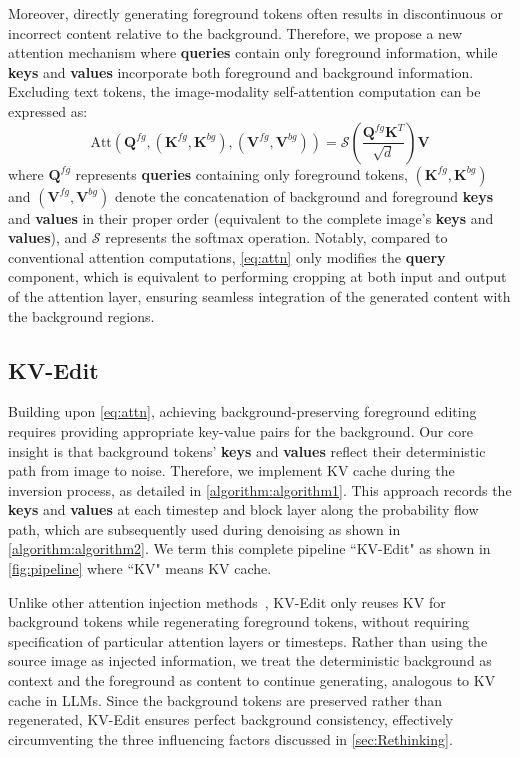 Moreover, directly generating foreground tokens often results in discontinuous or incorrect content relative to the background. Therefore, we propose a new attention mechanism where \textbf{queries} contain only foreground information, while \textbf{keys} and \textbf{values} incorporate both foreground and background information. Excluding text tokens, the image-modality self-attention computation can be expressed as:
\begin{equation}
\mathrm{Att}(\mathbf{Q}^{fg},(\mathbf{K}^{fg},\mathbf{K}^{bg}),(\mathbf{V}^{fg},\mathbf{V}^{bg}))=\mathcal{S}(\frac{\mathbf{Q}^{fg}\mathbf{K}^T}{\sqrt{d}})\mathbf{V}
\label{eq:attn}
\end{equation}
where $\mathbf{Q}^{fg}$ represents \textbf{queries} containing only foreground tokens, $(\mathbf{K}^{fg},\mathbf{K}^{bg})$ and $(\mathbf{V}^{fg},\mathbf{V}^{bg})$ denote the concatenation of background and foreground \textbf{keys} and \textbf{values} in their proper order (equivalent to the complete image's \textbf{keys} and \textbf{values}), and $\mathcal{S}$ represents the softmax operation. Notably, compared to conventional attention computations, \cref{eq:attn} only modifies the \textbf{query} component, which is equivalent to performing cropping at both input and output of the attention layer, ensuring seamless integration of the generated content with the background regions.


\subsection{KV-Edit}
\label{section:kv_edit}
Building upon \cref{eq:attn}, achieving background-preserving foreground editing requires providing appropriate key-value pairs for the background. Our core insight is that background tokens' \textbf{keys} and \textbf{values} reflect their deterministic path from image to noise. Therefore, we implement KV cache during the inversion process, as detailed in \cref{algorithm:algorithm1}. This approach records the \textbf{keys} and \textbf{values} at each timestep and block layer along the probability flow path, which are subsequently used during denoising as shown in \cref{algorithm:algorithm2}. We term this complete pipeline ``KV-Edit" as shown in \cref{fig:pipeline} where ``KV" means KV cache.

Unlike other attention injection methods~\cite{tumanyan2023plug,avrahami2024stable,tewel2024add}, KV-Edit only reuses KV for background tokens while regenerating foreground tokens, without requiring specification of particular attention layers or timesteps. Rather than using the source image as injected information, we treat the deterministic background as context and the foreground as content to continue generating, analogous to KV cache in LLMs. Since the background tokens are preserved rather than regenerated, KV-Edit ensures perfect background consistency, effectively circumventing the three influencing factors discussed in \cref{sec:Rethinking}.

